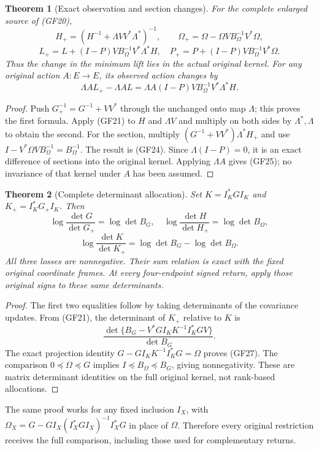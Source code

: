 \documentclass[11pt]{article}
\newtheorem{theorem}{Theorem}
\begin{document}
\begin{theorem}[Exact observation and section changes]
For the complete enlarged source of (GF20),
\[
H_+=(H^{-1}+\Lambda VV^*\Lambda^*)^{-1},\qquad
\Omega_+=\Omega-\Omega V B_\Omega^{-1}V^*\Omega,
\tag{GF23}
\]
\[
L_+=L+(I-P)V B_\Omega^{-1}V^*\Lambda^*H,
\quad
P_+=P+(I-P)V B_\Omega^{-1}V^*\Omega.
\tag{GF24}
\]
Thus the change in the minimum lift lies in the actual original kernel.
For any original action $A:E\to E$, its observed action changes by
\[
\Lambda A L_+-\Lambda A L
=\Lambda A(I-P)V B_\Omega^{-1}V^*\Lambda^*H.
\tag{GF25}
\]
\end{theorem}
\begin{proof}
Push $G_+^{-1}=G^{-1}+VV^*$ through the unchanged onto map $\Lambda$;
this proves the first formula. Apply (GF21) to $H$ and $\Lambda V$
and multiply on both sides by $\Lambda^*,\Lambda$ to obtain the
second. For the section, multiply
$(G^{-1}+VV^*)\Lambda^*H_+$ and use
$I-V^*\Omega V B_\Omega^{-1}=B_\Omega^{-1}$.
The result is (GF24). Since $\Lambda(I-P)=0$, it is an exact difference
of sections into the original kernel. Applying $\Lambda A$ gives
(GF25); no invariance of that kernel under $A$ has been assumed.
\end{proof}

\begin{theorem}[Complete determinant allocation]
Set $K=I_K^*GI_K$ and $K_+=I_K^*G_+I_K$. Then
\[
\log\frac{\det G}{\det G_+}=\log\det B_G,
\quad
\log\frac{\det H}{\det H_+}=\log\det B_\Omega,
\tag{GF26}
\]
\[
\boxed{\log\frac{\det K}{\det K_+}
=\log\det B_G-\log\det B_\Omega.}
\tag{GF27}
\]
All three losses are nonnegative. Their sum relation is exact with
the fixed original coordinate frames. At every four-endpoint signed
return, apply those original signs to these same determinants.
\end{theorem}
\begin{proof}
The first two equalities follow by taking determinants of the covariance
updates. From (GF21), the determinant of $K_+$ relative to $K$ is
\[
\frac{\det\{B_G-V^*GI_KK^{-1}I_K^*GV\}}{\det B_G}.
\]
The exact projection identity
$G-GI_KK^{-1}I_K^*G=\Omega$ proves (GF27).
The comparison $0\preceq\Omega\preceq G$ implies
$I\preceq B_\Omega\preceq B_G$, giving nonnegativity.
These are matrix determinant identities on the full original kernel,
not rank-based allocations.
\end{proof}

The same proof works for any fixed inclusion $I_X$, with
$\Omega_X=G-GI_X(I_X^*GI_X)^{-1}I_X^*G$ in place of $\Omega$.
Therefore every original restriction receives the full comparison,
including those used for complementary returns.
\end{document}
